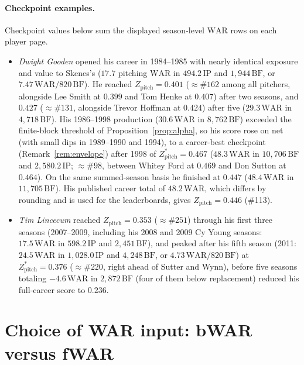 \documentclass[11pt,letterpaper]{article}
\theoremstyle{plain}
\theoremstyle{definition}
\theoremstyle{remark}
\newcommand{\WAR}{\mathrm{WAR}}
\newcommand{\BF}{\mathrm{BF}}
\newcommand{\IP}{\mathrm{IP}}
\newcommand{\Zpitch}{Z_{\mathrm{pitch}}}
\begin{document}
\paragraph{Checkpoint examples.} Checkpoint values below sum the displayed season-level $\WAR$ rows on each player page.
\begin{itemize}
    \item \emph{Dwight Gooden} opened his career in 1984--1985 with nearly identical exposure and value to Skenes's ($17.7$ pitching $\WAR$ in $494.2\,\IP$ and $1{,}944\,\BF$, or $7.47\,\WAR/820\,\BF$). He reached $\Zpitch = 0.401$ ($\approx \#162$ among all pitchers, alongside Lee Smith at $0.399$ and Tom Henke at $0.407$) after two seasons, and $0.427$ ($\approx \#131$, alongside Trevor Hoffman at $0.424$) after five ($29.3\,\WAR$ in $4{,}718\,\BF$). His 1986--1998 production ($30.6\,\WAR$ in $8{,}762\,\BF$) exceeded the finite-block threshold of Proposition~\ref{prop:alpha}, so his score rose on net (with small dips in 1989--1990 and 1994), to a career-best checkpoint (Remark~\ref{rem:envelope}) after 1998 of $\Zpitch^* = 0.467$ ($48.3\,\WAR$ in $10{,}706\,\BF$ and $2{,}580.2\,\IP$; $\approx \#98$, between Whitey Ford at $0.469$ and Don Sutton at $0.464$). On the same summed-season basis he finished at $0.447$ ($48.4\,\WAR$ in $11{,}705\,\BF$). His published career total of $48.2\,\WAR$, which differs by rounding and is used for the leaderboards, gives $\Zpitch = 0.446$ (\#113).
    \item \emph{Tim Lincecum} reached $\Zpitch = 0.353$ ($\approx \#251$) through his first three seasons (2007--2009, including his 2008 and 2009 Cy Young seasons: $17.5\,\WAR$ in $598.2\,\IP$ and $2{,}451\,\BF$), and peaked after his fifth season (2011: $24.5\,\WAR$ in $1{,}028.0\,\IP$ and $4{,}248\,\BF$, or $4.73\,\WAR/820\,\BF$) at $\Zpitch^* = 0.376$ ($\approx \#220$, right ahead of Sutter and Wynn), before five seasons totaling $-4.6\,\WAR$ in $2{,}872\,\BF$ (four of them below replacement) reduced his full-career score to $0.236$.
\end{itemize}

\section{Choice of WAR input: bWAR versus fWAR}
\label{app:fwar}
\end{document}
